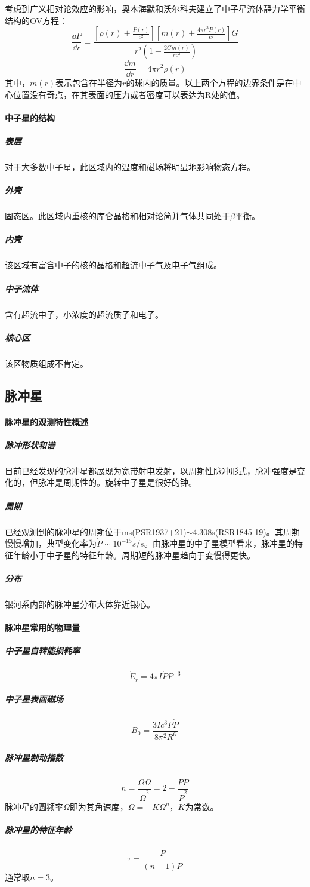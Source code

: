 考虑到广义相对论效应的影响，奥本海默和沃尔科夫建立了中子星流体静力学平衡结构的OV方程：
\begin{equation}
	\frac{\dd P}{\dd r}=\frac{\left[\rho(r)+\frac{P(r)}{c^2}\right]\left[m(r)+\frac{4\pi r^3P(r)}{c^2}\right]G}{r^2\left(1-\frac{2Gm(r)}{rc^2}\right)}
\end{equation}
\begin{equation}
	\frac{\dd m}{\dd r}=4\pi r^2\rho(r)
\end{equation}
其中，$m(r)$表示包含在半径为$r$的球内的质量。以上两个方程的边界条件是在中心位置没有奇点，在其表面的压力或者密度可以表达为R处的值。

\paragraph{中子星的结构}
\subparagraph{表层}对于大多数中子星，此区域内的温度和磁场将明显地影响物态方程。
\subparagraph{外壳}固态区。此区域内重核的库仑晶格和相对论简并气体共同处于$\beta$平衡。
\subparagraph{内壳}该区域有富含中子的核的晶格和超流中子气及电子气组成。
\subparagraph{中子流体}含有超流中子，小浓度的超流质子和电子。
\subparagraph{核心区}该区物质组成不肯定。
\subsection{脉冲星}
\paragraph{脉冲星的观测特性概述}
\subparagraph{脉冲形状和谱}目前已经发现的脉冲星都展现为宽带射电发射，以周期性脉冲形式，脉冲强度是变化的，但脉冲是周期性的。旋转中子星是很好的钟。
\subparagraph{周期}已经观测到的脉冲星的周期位于ms(PSR1937+21)$\sim$4.308s(RSR1845-19)。其周期慢慢增加，典型变化率为$\dot{P}\sim10^{-15}s/s$。由脉冲星的中子星模型看来，脉冲星的特征年龄小于中子星的特征年龄。周期短的脉冲星趋向于变慢得更快。
\subparagraph{分布}银河系内部的脉冲星分布大体靠近银心。
\paragraph{脉冲星常用的物理量}
\subparagraph{中子星自转能损耗率}
\begin{equation}
	\dot{E}_{r}=4\pi I\dot{P}P^{-3}
\end{equation}
\subparagraph{中子星表面磁场}
\begin{equation}
	B_{0}=\frac{3Ic^3P\dot{P}}{8\pi^2R^6}
\end{equation}
\subparagraph{脉冲星制动指数}
\begin{equation}
	n=\frac{\Omega\ddot{\Omega}}{\dot{\Omega}^2}=2-\frac{\ddot{P}P}{\dot{P}^2}
\end{equation}
脉冲星的圆频率$\Omega$即为其角速度，$\dot{\Omega}=-K\Omega^{n}$，$K$为常数。
\subparagraph{脉冲星的特征年龄}
\begin{equation}
	\tau=\frac{P}{(n-1)\dot{P}}
\end{equation}
通常取$n=3$。

